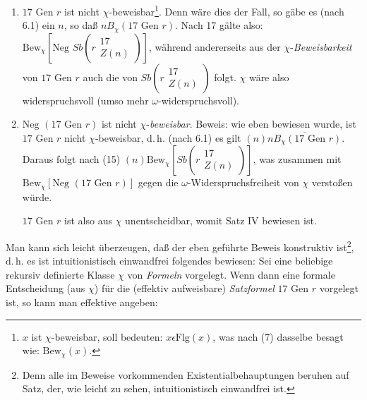 \documentclass[draft]{scrartcl}
\newcounter{commentaryNumber}
\begin{document}
\begin{enumerate}
	\item $17 \text{ Gen } r$ ist nicht
		$\chi$-beweisbar\footnote{$x$ ist $\chi$-beweisbar, soll bedeuten:
		$x \epsilon \text{Flg}\left(x\right)$,
		was nach (7) dasselbe besagt wie: $\text{Bew}_\chi\left(x\right)$.}. Denn
		wäre dies der Fall, so gäbe es (nach 6.1) ein $n$, so daß
		$n B_\chi \left(17 \text{ Gen } r\right)$. Nach 17 gälte also:
		$\text{Bew}_\chi \left[\text{Neg }Sb\left(r\substack{17\\ Z\left(n\right)}\right)\right]$,
		während andererseits aus der $\chi$-\textit{Beweisbarkeit} von $17 \text{ Gen } r$ auch
		die von $Sb \left(r\substack{17\\ Z\left(n\right)}\right)$ folgt. $\chi$ wäre also
		widerspruchsvoll (umso mehr $\omega$-widerspruchsvoll).

	\item $\text{Neg }\left(17 \text{ Gen } r\right)$ ist nicht
		$\chi$-\textit{beweisbar}. Beweis: wie eben bewiesen wurde,
		ist $17 \text{ Gen } r$ nicht $\chi$-beweisbar, d.\,h.
		(nach 6.1) es gilt $\left(n\right)\overline{n B_\chi\left(17\text{ Gen } r\right)}$.
		Daraus folgt nach (15) $\left(n\right) \text{Bew}_\chi\left[Sb\left(r\substack{17\\ Z\left(n\right)}\right)\right]$,
		was zusammen mit $\text{Bew}_\chi\left[\text{Neg }\left(17 \text{ Gen } r\right)\right]$
		gegen die $\omega$-Widerspruchsfreiheit von $\chi$ verstoßen würde.

	$17\text{ Gen } r$ ist also aus $\chi$ unentscheidbar, womit Satz IV bewiesen ist.
\end{enumerate}

\let\originalfootnote=\thefootnote
\let\thefootnote=\fnfunfundvierziga
Man kann sich leicht überzeugen,
daß der eben geführte Beweis konstruktiv ist\footnote{Denn alle im Beweise
vorkommenden Existentialbehauptungen beruhen auf Satz, der, wie leicht zu sehen,
intuitionistisch einwandfrei ist.},
\let\thefootnote=\originalfootnote
\setcounter{footnote}{45}
d.\,h. es ist intuitionistisch einwandfrei folgendes bewiesen:
Sei eine beliebige rekursiv definierte Klasse $\chi$
von \textit{Formeln} vorgelegt. Wenn dann eine formale Entscheidung (aus $\chi$) für die (effektiv aufweisbare)
\textit{Satzformel} $17 \text{ Gen } r$ vorgelegt ist, so kann man effektive angeben:
\end{document}
